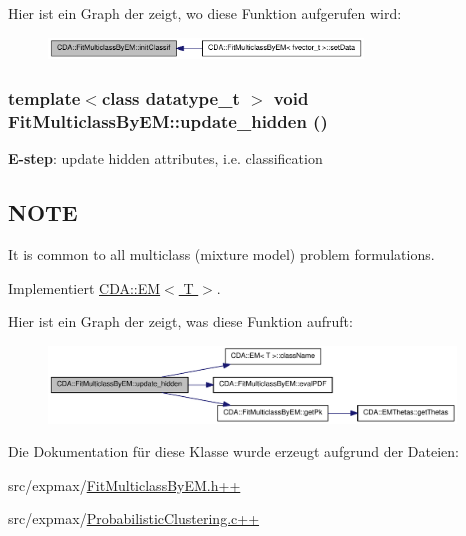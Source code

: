 Hier ist ein Graph der zeigt, wo diese Funktion aufgerufen wird:\nopagebreak
\begin{figure}[H]
\begin{center}
\leavevmode
\includegraphics[width=237pt]{classCDA_1_1FitMulticlassByEM_a10d9a6e699530aa071dd33ea7b980f53_icgraph}
\end{center}
\end{figure}


\hypertarget{classCDA_1_1FitMulticlassByEM_a7c40c5528a4b8b32e2455056f60d76de}{
\subsubsection[{update\_\-hidden}]{\setlength{\rightskip}{0pt plus 5cm}template$<$class datatype\_\-t $>$ void FitMulticlassByEM::update\_\-hidden ()}}
\label{classCDA_1_1FitMulticlassByEM_a7c40c5528a4b8b32e2455056f60d76de}


{\bfseries E-\/step}: update hidden attributes, i.e. classification 

\hypertarget{GaussianMixtureModel1D_8h_09_09_NOTE}{}\subsection{NOTE}\label{GaussianMixtureModel1D_8h_09_09_NOTE}
It is common to all multiclass (mixture model) problem formulations. 

Implementiert \hyperlink{classCDA_1_1EM_af116066dfe282586d4219fb588a021d7}{CDA::EM$<$ T $>$}.



Hier ist ein Graph der zeigt, was diese Funktion aufruft:\nopagebreak
\begin{figure}[H]
\begin{center}
\leavevmode
\includegraphics[width=307pt]{classCDA_1_1FitMulticlassByEM_a7c40c5528a4b8b32e2455056f60d76de_cgraph}
\end{center}
\end{figure}




Die Dokumentation für diese Klasse wurde erzeugt aufgrund der Dateien:\begin{DoxyCompactItemize}
\item 
src/expmax/\hyperlink{FitMulticlassByEM_8h_09_09}{FitMulticlassByEM.h++}\item 
src/expmax/\hyperlink{ProbabilisticClustering_8c_09_09}{ProbabilisticClustering.c++}\end{DoxyCompactItemize}
